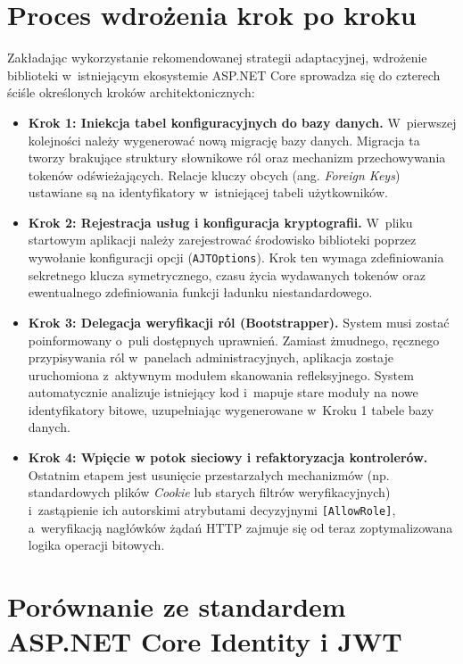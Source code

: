 \documentclass{SGGW-thesis}
\begin{document}
\section{Proces wdrożenia krok po kroku}

Zakładając wykorzystanie rekomendowanej strategii adaptacyjnej, wdrożenie biblioteki w~istniejącym ekosystemie ASP.NET Core sprowadza się do czterech ściśle określonych kroków architektonicznych:

\begin{itemize}
    \item \textbf{Krok 1: Iniekcja tabel konfiguracyjnych do bazy danych.} W~pierwszej kolejności należy wygenerować nową migrację bazy danych. Migracja ta tworzy brakujące struktury słownikowe ról oraz mechanizm przechowywania tokenów odświeżających. Relacje kluczy obcych (ang. \textit{Foreign Keys}) ustawiane są na identyfikatory w~istniejącej tabeli użytkowników.
    
    \item \textbf{Krok 2: Rejestracja usług i konfiguracja kryptografii.} W~pliku startowym aplikacji należy zarejestrować środowisko biblioteki poprzez wywołanie konfiguracji opcji (\texttt{AJTOptions}). Krok ten wymaga zdefiniowania sekretnego klucza symetrycznego, czasu życia wydawanych tokenów oraz ewentualnego zdefiniowania funkcji ładunku niestandardowego.
    
    \item \textbf{Krok 3: Delegacja weryfikacji ról (Bootstrapper).} System musi zostać poinformowany o~puli dostępnych uprawnień. Zamiast żmudnego, ręcznego przypisywania ról w~panelach administracyjnych, aplikacja zostaje uruchomiona z~aktywnym modułem skanowania refleksyjnego. System automatycznie analizuje istniejący kod i~mapuje stare moduły na nowe identyfikatory bitowe, uzupełniając wygenerowane w~Kroku 1 tabele bazy danych.
    
    \item \textbf{Krok 4: Wpięcie w potok sieciowy i refaktoryzacja kontrolerów.} Ostatnim etapem jest usunięcie przestarzałych mechanizmów (np. standardowych plików \textit{Cookie} lub starych filtrów weryfikacyjnych) i~zastąpienie ich autorskimi atrybutami decyzyjnymi \texttt{[AllowRole]}, a~weryfikacją nagłówków żądań HTTP zajmuje się od teraz zoptymalizowana logika operacji bitowych.
\end{itemize}

\section{Porównanie ze standardem ASP.NET Core Identity i JWT}
\end{document}
